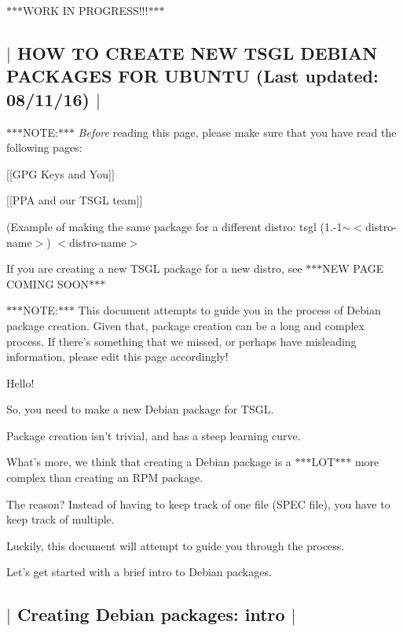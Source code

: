 $\ast$$\ast$$\ast$\-W\-O\-R\-K I\-N P\-R\-O\-G\-R\-E\-S\-S!!!$\ast$$\ast$$\ast$ 

 \subsection*{$\vert$ H\-O\-W T\-O C\-R\-E\-A\-T\-E N\-E\-W T\-S\-G\-L D\-E\-B\-I\-A\-N P\-A\-C\-K\-A\-G\-E\-S F\-O\-R U\-B\-U\-N\-T\-U (Last updated\-: 08/11/16) $\vert$ }

$\ast$$\ast$$\ast$\-N\-O\-T\-E\-:$\ast$$\ast$$\ast$ {\itshape Before} reading this page, please make sure that you have read the following pages\-:


\begin{DoxyItemize}
\item \mbox{[}\mbox{[}G\-P\-G Keys and You\mbox{]}\mbox{]}
\item \mbox{[}\mbox{[}P\-P\-A and our T\-S\-G\-L team\mbox{]}\mbox{]}
\end{DoxyItemize}

(Example of making the same package for a different distro\-: tsgl (1.-\/1$\sim$$<$distro-\/name$>$) $<$distro-\/name$>$

If you are creating a new T\-S\-G\-L package for a new distro, see $\ast$$\ast$$\ast$\-N\-E\-W P\-A\-G\-E C\-O\-M\-I\-N\-G S\-O\-O\-N$\ast$$\ast$$\ast$

$\ast$$\ast$$\ast$\-N\-O\-T\-E\-:$\ast$$\ast$$\ast$ This document attempts to guide you in the process of Debian package creation. Given that, package creation can be a long and complex process. If there's something that we missed, or perhaps have misleading information, please edit this page accordingly!

Hello!

So, you need to make a new Debian package for T\-S\-G\-L.

Package creation isn't trivial, and has a steep learning curve.

What's more, we think that creating a Debian package is a $\ast$$\ast$$\ast$\-L\-O\-T$\ast$$\ast$$\ast$ more complex than creating an R\-P\-M package.

The reason? Instead of having to keep track of one file (S\-P\-E\-C file), you have to keep track of multiple.

Luckily, this document will attempt to guide you through the process.

Let's get started with a brief intro to Debian packages. 

 \subsection*{$\vert$ Creating Debian packages\-: intro $\vert$ }

